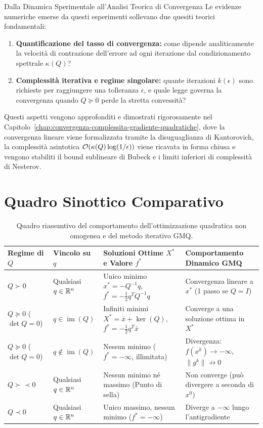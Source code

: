 \begin{noteblock}{Dalla Dinamica Sperimentale all'Analisi Teorica di Convergenza}
Le evidenze numeriche emerse da questi esperimenti sollevano due quesiti teorici fondamentali:
\begin{enumerate}
    \item \textbf{Quantificazione del tasso di convergenza:} come dipende analiticamente la velocit\`a di contrazione dell'errore ad ogni iterazione dal condizionamento spettrale $\kappa(Q)$?
    \item \textbf{Complessit\`a iterativa e regime singolare:} quante iterazioni $k(\epsilon)$ sono richieste per raggiungere una tolleranza $\epsilon$, e quale legge governa la convergenza quando $Q \succeq 0$ perde la stretta convessit\`a?
\end{enumerate}
Questi aspetti vengono approfonditi e dimostrati rigorosamente nel Capitolo~\ref{chap:convergenza-complessita-gradiente-quadratiche}, dove la convergenza lineare viene formalizzata tramite la disuguaglianza di Kantorovich, la complessit\`a asintotica $\mathcal{O}\!\left(\kappa(Q) \log(1/\epsilon)\right)$ viene ricavata in forma chiusa e vengono stabiliti il bound sublineare di Bubeck e i limiti inferiori di complessit\`a di Nesterov.
\end{noteblock}

\FloatBarrier
\section{Quadro Sinottico Comparativo}
\label{sec:quadro-sinottico-ottimizzazione-quadratica}

\begin{table}[H]
\centering
\small
\renewcommand{\arraystretch}{1.35}
\begin{tabularx}{\textwidth}{l >{\raggedright\arraybackslash}p{2.6cm} Y >{\raggedright\arraybackslash}p{3.1cm}}
\toprule
\textbf{Regime di $Q$} & \textbf{Vincolo su $q$} & \textbf{Soluzioni Ottime $X^*$ e Valore $f^*$} & \textbf{Comportamento Dinamico GMQ} \\
\midrule
$Q \succ 0$ & Qualsiasi $q \in \mathbb{R}^n$ & Unico minimo $x^* = -Q^{-1}q$, $f^* = -\frac{1}{2}q^T Q^{-1}q$ & Convergenza lineare a $x^*$ (1 passo se $Q=I$) \\
$Q \succeq 0$ ($\det Q = 0$) & $q \in \operatorname{im}(Q)$ & Infiniti minimi $X^* = \bar{x} + \ker(Q)$, $f^* = -\frac{1}{2}q^T \bar{x}$ & Converge a una soluzione ottima in $X^*$ \\
$Q \succeq 0$ ($\det Q = 0$) & $q \notin \operatorname{im}(Q)$ & Nessun minimo ($f^* = -\infty$, illimitata) & Divergenza: $f(x^k) \to -\infty$, $\|g^k\| \not\to 0$ \\
$Q \succ\prec 0$ & Qualsiasi $q \in \mathbb{R}^n$ & Nessun minimo né massimo (Punto di sella) & Non converge (può divergere a seconda di $x^0$) \\
$Q \prec 0$ & Qualsiasi $q \in \mathbb{R}^n$ & Unico massimo, nessun minimo ($f^* = -\infty$) & Diverge a $-\infty$ lungo l'antigradiente \\
\bottomrule
\end{tabularx}
\caption{Quadro riassuntivo del comportamento dell'ottimizzazione quadratica non omogenea e del metodo iterativo GMQ.}
\label{tab:sinottico-quadratica-gmq}
\end{table}
